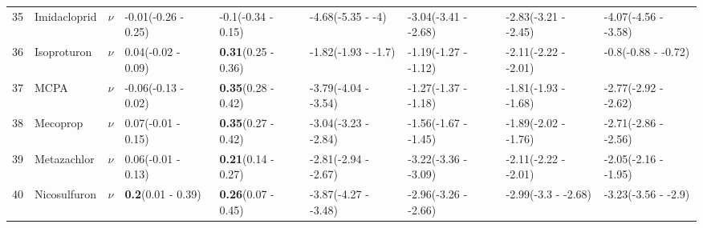 \begin{landscape}
\begin{longtable}{lp{2cm}p{0.6cm}p{1.8cm}p{1.8cm}p{1.8cm}p{1.8cm}p{1.8cm}p{1.8cm}}
  35 & Imidacloprid & $\nu$ & -0.01\newline (-0.26 - 0.25) & -0.1\newline (-0.34 - 0.15) & -4.68\newline (-5.35 - -4) & -3.04\newline (-3.41 - -2.68) & -2.83\newline (-3.21 - -2.45) & -4.07\newline (-4.56 - -3.58) \\ 
  36 & Isoproturon & $\nu$ & 0.04\newline (-0.02 - 0.09) & \textbf{0.31}\newline (0.25 - 0.36) & -1.82\newline (-1.93 - -1.7) & -1.19\newline (-1.27 - -1.12) & -2.11\newline (-2.22 - -2.01) & -0.8\newline (-0.88 - -0.72) \\ 
  37 & MCPA & $\nu$ & -0.06\newline (-0.13 - 0.02) & \textbf{0.35}\newline (0.28 - 0.42) & -3.79\newline (-4.04 - -3.54) & -1.27\newline (-1.37 - -1.18) & -1.81\newline (-1.93 - -1.68) & -2.77\newline (-2.92 - -2.62) \\ 
  38 & Mecoprop & $\nu$ & 0.07\newline (-0.01 - 0.15) & \textbf{0.35}\newline (0.27 - 0.42) & -3.04\newline (-3.23 - -2.84) & -1.56\newline (-1.67 - -1.45) & -1.89\newline (-2.02 - -1.76) & -2.71\newline (-2.86 - -2.56) \\ 
  39 & Metazachlor & $\nu$ & 0.06\newline (-0.01 - 0.13) & \textbf{0.21}\newline (0.14 - 0.27) & -2.81\newline (-2.94 - -2.67) & -3.22\newline (-3.36 - -3.09) & -2.11\newline (-2.22 - -2.01) & -2.05\newline (-2.16 - -1.95) \\ 
  40 & Nicosulfuron & $\nu$ & \textbf{0.2}\newline (0.01 - 0.39) & \textbf{0.26}\newline (0.07 - 0.45) & -3.87\newline (-4.27 - -3.48) & -2.96\newline (-3.26 - -2.66) & -2.99\newline (-3.3 - -2.68) & -3.23\newline (-3.56 - -2.9) \\ 

\end{longtable}
\end{landscape}
